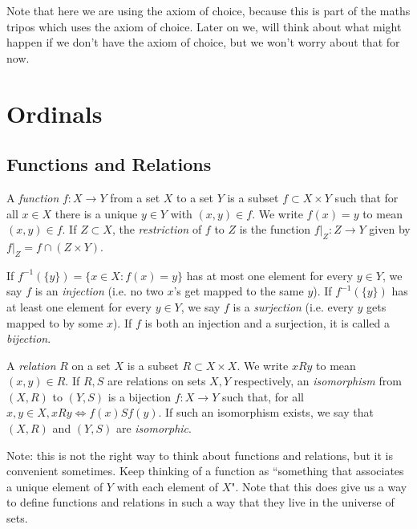 \documentclass[10pt,a4paper]{article}
\begin{document}
Note that here we are using the axiom of choice, because this is part of the maths tripos which uses the axiom of choice. Later on we, will think about what might happen if we don't have the axiom of choice, but we won't worry about that for now.

\section{Ordinals}
\subsection{Functions and Relations}
A \emph{function} $f:X \to Y$ from a set $X$ to a set $Y$ is a subset $f \subset X\times Y$ such that for all $x \in X$ there is a unique $y \in Y$ with $(x,y) \in f$. We write $f(x) = y$ to mean $(x,y) \in f$. If $Z \subset X$, the \emph{restriction} of $f$ to $Z$ is the function $f|_Z:Z\to Y$ given by $f|_Z = f \cap (Z\times Y)$.

If $f^{-1}(\{y\}) = \{x \in X: f(x) = y\}$ has at most one element for every $y \in Y$, we say $f$ is an \emph{injection} (i.e. no two $x$'s get mapped to the same $y$). If $f^{-1}(\{y\})$ has at least one element for every $y \in Y$, we say $f$ is a \emph{surjection} (i.e. every $y$ gets mapped to by some $x$). If $f$ is both an injection and a surjection, it is called a \emph{bijection}.

A \emph{relation} $R$ on a set $X$ is a subset $R \subset X \times X$. We write $xRy$ to mean $(x,y) \in R$. If $R, S$ are relations on sets $X, Y$ respectively, an \emph{isomorphism} from $(X,R)$ to $(Y,S)$ is a bijection $f:X \to Y$ such that, for all $x, y \in X, xRy \iff f(x)Sf(y)$. If such an isomorphism exists, we say that $(X,R)$ and $(Y,S)$ are \emph{isomorphic}.

Note: this is not the right way to think about functions and relations, but it is convenient sometimes. Keep thinking of a function as ``something that associates a unique element of $Y$ with each element of $X$". Note that this does give us a way to define functions and relations in such a way that they live in the universe of sets.
\end{document}
